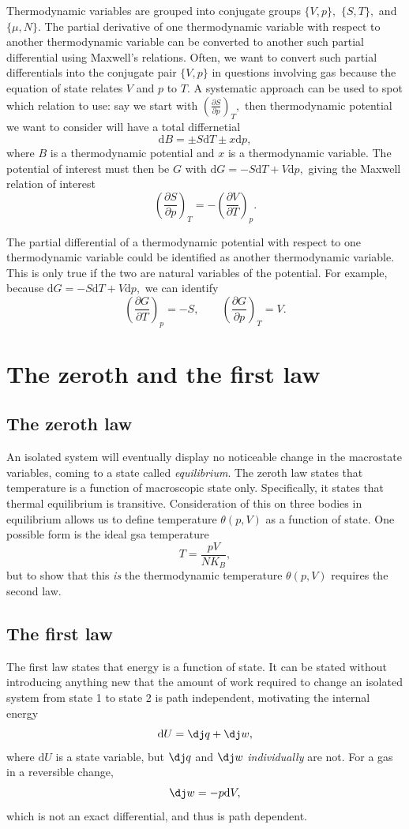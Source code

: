 \documentclass{article}
\theoremstyle{nonumberplain}
\begin{document}
Thermodynamic variables are grouped into conjugate groups $\{V,p\},$ $\{S,T\},$ and $\{\mu ,N\}.$ The partial derivative of one thermodynamic variable with respect to another thermodynamic variable can be converted to another such partial differential using Maxwell's relations. Often, we want to convert such partial differentials into the conjugate pair $\{V,p\}$ in questions involving gas because the equation of state relates $V$ and $p$ to $T.$ A systematic approach can be used to spot which relation to use: say we start with 
\(
    \left( \frac{\partial S}{\partial p} \right)_{T}, 
\)
then thermodynamic potential we want to consider will have a total differnetial
\[
    \mathrm{d} B = \pm S \mathrm{d} T \pm x \mathrm{d} p, 
\]
where $B$ is a thermodynamic potential and $x$ is a thermodynamic variable. The potential of interest must then be $G$ with $\mathrm{d} G = -S\mathrm{d} T + V \mathrm{d} p,$ giving the Maxwell relation of interest
\[
    \left( \frac{\partial S}{\partial p} \right)_{T} = 
    -\left( \frac{\partial V}{\partial T} \right)_{p}. 
\]

The partial differential of a thermodynamic potential with respect to one thermodynamic variable could be identified as another thermodynamic variable. This is only true if the two are natural variables of the potential. For example, because \(\mathrm{d} G = -S\mathrm{d} T + V \mathrm{d} p,\) we can identify
\[
    \left( \frac{\partial G}{\partial T} \right)_{p} = -S, 
    \qquad
    \left( \frac{\partial G}{\partial p} \right)_{T} = V.
\]
\section{The zeroth and the first law}
\subsection{The zeroth law}
An isolated system will eventually display no noticeable change in the macrostate variables, coming to a state called \textit{equilibrium}. The zeroth law states that temperature is a function of macroscopic state only. Specifically, it states that thermal equilibrium is transitive. Consideration of this on three bodies in equilibrium allows us to define temperature $\theta(p,V)$ as a function of state. One possible form is the ideal gsa temperature 
\[
    T = \frac{p V}{N K_B}, 
\]
but to show that this \textit{is} the thermodynamic temperature $\theta(p,V)$ requires the second law. 

\subsection{The first law}
The first law states that energy is a function of state. It can be stated without introducing anything new that the amount of work required to change an isolated system from state 1 to state 2 is path independent, motivating the internal energy 
\[
    \mathrm{d} U = \mathrm{\dj} q + \dj w,  
\]
where $\mathrm{d} U$ is a state variable, but $\dj q$ and $\dj w$ \textit{individually} are not. For a gas in a reversible change, 
\[
    \dj w = - p \mathrm{d} V,
\]
which is not an exact differential, and thus is path dependent.  
\end{document}
